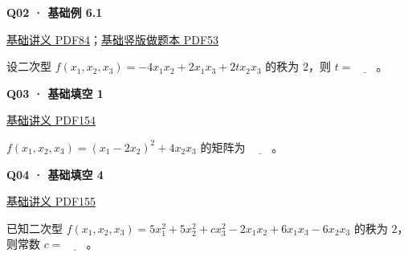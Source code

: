 \documentclass[UTF8,fontset=fandol,11pt,a4paper]{ctexart}
\newcommand{\source}[1]{{\footnotesize\color{Muted}#1\par}}
\newcommand{\qtitle}[2]{\par\needspace{5\baselineskip}\hypertarget{#1}{}\label{#1}\textbf{#2}\par}
\begin{document}
\begin{minipage}{\linewidth}
\qtitle{B-EX-01}{Q02 · 基础例 6.1}
\source{\href{file:///Users/skyintelligence/Desktop/\%E5\%BE\%97\%E8\%AF\%BB\%E4\%B8\%AA\%E7\%A0\%94-\%E5\%8C\%97\%E5\%A4\%A7\%E8\%BD\%AF\%E5\%BE\%AE/\%E6\%95\%B0\%E5\%AD\%A6\%20150/\%E8\%AE\%B2\%E4\%B9\%89/\%E3\%80\%90\%E4\%B8\%80\%E9\%AB\%98\%E6\%95\%B0Kira\%E3\%80\%9127\%E8\%80\%83\%E7\%A0\%94\%E7\%BA\%BF\%E4\%BB\%A3\%E5\%9F\%BA\%E7\%A1\%80\%E8\%AE\%B2\%E4\%B9\%89\%26\%E4\%B9\%A0\%E9\%A2\%98-\%E7\%94\%B5\%E5\%AD\%90\%E7\%89\%88.pdf\#page=84}{基础讲义 PDF84}；\href{file:///Users/skyintelligence/Desktop/\%E5\%BE\%97\%E8\%AF\%BB\%E4\%B8\%AA\%E7\%A0\%94-\%E5\%8C\%97\%E5\%A4\%A7\%E8\%BD\%AF\%E5\%BE\%AE/\%E6\%95\%B0\%E5\%AD\%A6\%20150/\%E8\%AE\%B2\%E4\%B9\%89/\%E3\%80\%90\%E7\%AB\%96\%E7\%89\%88\%E3\%80\%9127\%E8\%80\%83\%E7\%A0\%94Kira\%E7\%BA\%BF\%E4\%BB\%A3\%E5\%9F\%BA\%E7\%A1\%80\%E8\%AE\%B2\%E4\%B9\%89\%E5\%81\%9A\%E9\%A2\%98\%E6\%9C\%AC\%281\%29.pdf\#page=53}{基础竖版做题本 PDF53}}
设二次型 $f(x_1,x_2,x_3)=-4x_1x_2+2x_1x_3+2tx_2x_3$ 的秩为 $2$，则 $t=\underline{\qquad}$。
\end{minipage}\par\vspace{7mm}
\begin{minipage}{\linewidth}
\qtitle{B-FB-01}{Q03 · 基础填空 1}
\source{\href{file:///Users/skyintelligence/Desktop/\%E5\%BE\%97\%E8\%AF\%BB\%E4\%B8\%AA\%E7\%A0\%94-\%E5\%8C\%97\%E5\%A4\%A7\%E8\%BD\%AF\%E5\%BE\%AE/\%E6\%95\%B0\%E5\%AD\%A6\%20150/\%E8\%AE\%B2\%E4\%B9\%89/\%E3\%80\%90\%E4\%B8\%80\%E9\%AB\%98\%E6\%95\%B0Kira\%E3\%80\%9127\%E8\%80\%83\%E7\%A0\%94\%E7\%BA\%BF\%E4\%BB\%A3\%E5\%9F\%BA\%E7\%A1\%80\%E8\%AE\%B2\%E4\%B9\%89\%26\%E4\%B9\%A0\%E9\%A2\%98-\%E7\%94\%B5\%E5\%AD\%90\%E7\%89\%88.pdf\#page=154}{基础讲义 PDF154}}
$f(x_1,x_2,x_3)=(x_1-2x_2)^2+4x_2x_3$ 的矩阵为 $\underline{\qquad}$。
\end{minipage}\par\vspace{7mm}
\begin{minipage}{\linewidth}
\qtitle{B-FB-04}{Q04 · 基础填空 4}
\source{\href{file:///Users/skyintelligence/Desktop/\%E5\%BE\%97\%E8\%AF\%BB\%E4\%B8\%AA\%E7\%A0\%94-\%E5\%8C\%97\%E5\%A4\%A7\%E8\%BD\%AF\%E5\%BE\%AE/\%E6\%95\%B0\%E5\%AD\%A6\%20150/\%E8\%AE\%B2\%E4\%B9\%89/\%E3\%80\%90\%E4\%B8\%80\%E9\%AB\%98\%E6\%95\%B0Kira\%E3\%80\%9127\%E8\%80\%83\%E7\%A0\%94\%E7\%BA\%BF\%E4\%BB\%A3\%E5\%9F\%BA\%E7\%A1\%80\%E8\%AE\%B2\%E4\%B9\%89\%26\%E4\%B9\%A0\%E9\%A2\%98-\%E7\%94\%B5\%E5\%AD\%90\%E7\%89\%88.pdf\#page=155}{基础讲义 PDF155}}
已知二次型 $f(x_1,x_2,x_3)=5x_1^2+5x_2^2+cx_3^2-2x_1x_2+6x_1x_3-6x_2x_3$ 的秩为 $2$，则常数 $c=\underline{\qquad}$。
\end{minipage}\par\vspace{7mm}
\end{document}
